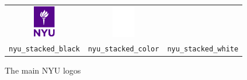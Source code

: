 \documentclass{article}
\begin{document}
\begin{figure}
\begin{tabular}{ccc}
        \includegraphics[width=0.3\textwidth]{nyu_stacked_color} &
        \includegraphics[width=0.3\textwidth]{nyu_stacked_white} \\
        \texttt{nyu\_stacked\_black} &
        \texttt{nyu\_stacked\_color} &
        \texttt{nyu\_stacked\_white} 
    \end{tabular}
    \caption{The main NYU logos}
\end{figure}
\end{document}
